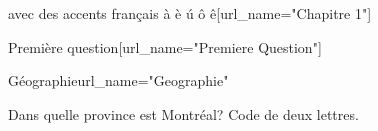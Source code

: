 \begin{edXchapter}{avec des accents français à è ú ô ê}[url_name="Chapitre 1"]

\begin{edXsequential}{Première question}[url_name="Premiere Question"]

\begin{edXvertical}

\begin{edXproblem}{Géographie}{url_name="Geographie"}

Dans quelle province est Montréal? Code de deux lettres.



\end{edXproblem}

\end{edXvertical}

\end{edXsequential}

\end{edXchapter}
